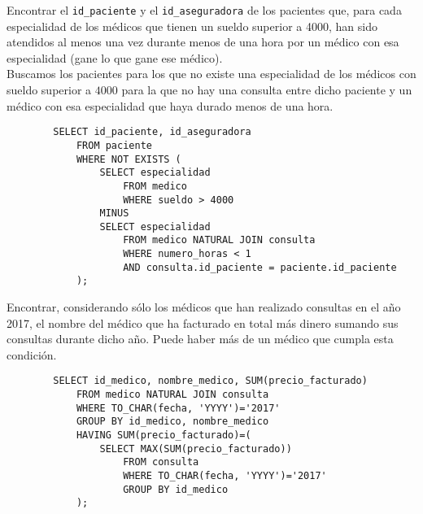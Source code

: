 \documentclass[12pt]{article}
\begin{document}
\begin{ejercicio}[SQL]
    Encontrar el \verb|id_paciente| y el \verb|id_aseguradora| de los pacientes que, para cada especialidad de los médicos que tienen un sueldo superior a 4000, han sido atendidos al menos una vez durante menos de una hora por un médico con esa especialidad (gane lo que gane ese médico).\\

    Buscamos los pacientes para los que no existe una especialidad de los médicos con sueldo superior a $4000$ para la que no hay una consulta entre dicho paciente y un médico con esa especialidad que haya durado menos de una hora.
    \begin{verbatim}
        SELECT id_paciente, id_aseguradora
            FROM paciente
            WHERE NOT EXISTS (
                SELECT especialidad
                    FROM medico
                    WHERE sueldo > 4000
                MINUS
                SELECT especialidad
                    FROM medico NATURAL JOIN consulta
                    WHERE numero_horas < 1
                    AND consulta.id_paciente = paciente.id_paciente
            );
    \end{verbatim}
\end{ejercicio}

\begin{ejercicio}[SQL]
    Encontrar, considerando sólo los médicos que han realizado consultas en el año 2017, el nombre del médico que ha facturado en total más dinero sumando sus consultas durante dicho año. Puede haber más de un médico que cumpla esta condición.
    \begin{verbatim}
        SELECT id_medico, nombre_medico, SUM(precio_facturado)
            FROM medico NATURAL JOIN consulta
            WHERE TO_CHAR(fecha, 'YYYY')='2017'
            GROUP BY id_medico, nombre_medico
            HAVING SUM(precio_facturado)=(
                SELECT MAX(SUM(precio_facturado))
                    FROM consulta
                    WHERE TO_CHAR(fecha, 'YYYY')='2017'
                    GROUP BY id_medico
            );
    \end{verbatim}
\end{ejercicio}
\end{document}
